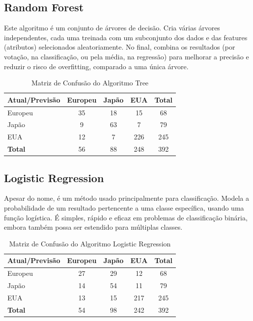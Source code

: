 \documentclass[conference]{IEEEtran}
\begin{document}
\subsection{Random Forest}
Este algoritmo é um conjunto de árvores de decisão. Cria várias árvores independentes, cada uma treinada com 
um subconjunto dos dados e das features (atributos) selecionados aleatoriamente. No final, combina os resultados 
(por votação, na classificação, ou pela média, na regressão) para melhorar a precisão e reduzir o risco de overfitting, 
comparado a uma única árvore.
\begin{table}[!ht]
    \centering
    \begin{tabular}{lcccc}
    \toprule
    \textbf{Atual/Previsão} & \textbf{Europeu} & \textbf{Japão} & \textbf{EUA} & \textbf{Total} \\
    \midrule
    Europeu & 35 & 18 & 15 & 68 \\
    Japão  & 9 & 63 & 7 & 79 \\
    EUA    & 12 & 7 & 226 & 245 \\
    \midrule
    \textbf{Total} & 56 & 88 & 248 & 392 \\
    \bottomrule
    \end{tabular}
    \label{tab:conf_matrix_forest}
    \caption{Matriz de Confusão do Algoritmo Tree}
\end{table}

\subsection{Logistic Regression}
Apesar do nome, é um método usado principalmente para classificação. Modela a probabilidade de um resultado pertencente a 
uma classe específica, usando uma função logística. É simples, rápido e eficaz em problemas de classificação binária, 
embora também possa ser estendido para múltiplas classes.
\begin{table}[!ht]
    \centering
    \begin{tabular}{lcccc}
    \toprule
    \textbf{Atual/Previsão} & \textbf{Europeu} & \textbf{Japão} & \textbf{EUA} & \textbf{Total} \\
    \midrule
    Europeu & 27 & 29 & 12 & 68 \\
    Japão  & 14 & 54 & 11 & 79 \\
    EUA    & 13 & 15 & 217 & 245 \\
    \midrule
    \textbf{Total} & 54 & 98 & 242 & 392 \\
    \bottomrule
    \end{tabular}
    \label{tab:conf_matrix_logistic}
    \caption{Matriz de Confusão do Algoritmo Logistic Regression}
\end{table}
\end{document}
